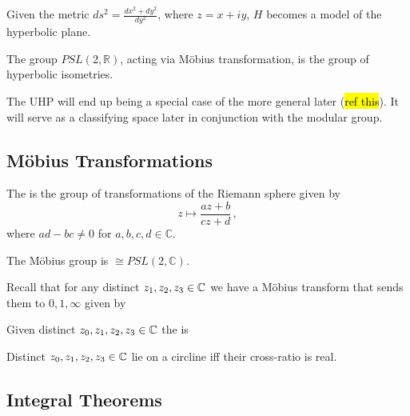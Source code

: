 \documentclass{article}
\begin{document}
\begin{prop}
	Given the metric $ds^2 = \frac{dx^2+dy^2}{dy^2}$, where $z=x+iy$, $H$ becomes a model of the hyperbolic plane.  
\end{prop}

\begin{prop}
	The group $PSL(2, \mathbb{R})$, acting via M\"obius transformation, is the group of hyperbolic isometries. 
\end{prop}

The UHP will end up being a special case of the more general  later (\hl{ref this}). It will serve as a classifying space later in conjunction with the modular group. 
\subsection{M\"obius Transformations}
\begin{definition}
The  is the group of transformations of the Riemann sphere given by 
\[
z \mapsto \frac{az+b}{cz+d} \, ,
\]
where $ad-bc \neq 0$ for $a,b,c,d \in \mathbb{C}$.
\end{definition}
\begin{lemma}
	The M\"obius group is $\cong PSL(2, \mathbb{C})$. 
\end{lemma}

Recall that for any distinct $z_1, z_2, z_3 \in \mathbb{C}$ we have a M\"obius transform that sends them to $0,1,\infty$ given by 
\begin{definition}
	Given distinct $z_0, z_1, z_2, z_3 \in \mathbb{C}$ the  is 
\end{definition}

\begin{prop}
	Distinct $z_0, z_1, z_2, z_3 \in \mathbb{C}$ lie on a circline iff their cross-ratio is real. 
\end{prop}

\subsection{Integral Theorems}
\end{document}
